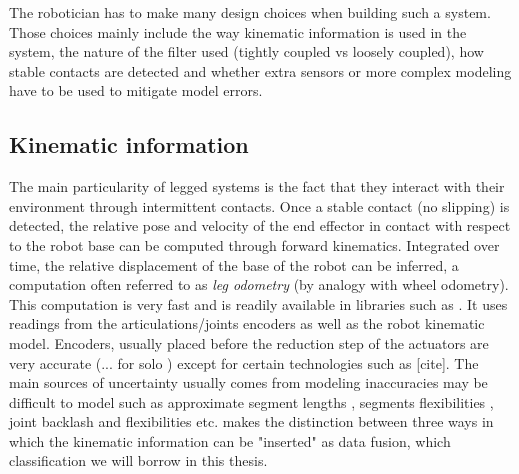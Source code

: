 The robotician has to make many design choices when building such a system. Those choices mainly include the way kinematic information is used in the system, 
the nature of the filter used (tightly coupled vs loosely coupled), how stable contacts are detected and whether extra sensors or more complex modeling have 
to be used to mitigate model errors.
 

\subsection{Kinematic information}
The main particularity of legged systems is the fact that they interact with their environment through intermittent contacts.
Once a stable contact (no slipping) is detected, the relative pose and velocity of the end effector in contact with respect to the robot base 
can be computed through forward kinematics. Integrated over time, the relative displacement of the base of the robot can be inferred, a computation 
often referred to as \textit{leg odometry} (by analogy with wheel odometry). This computation is very fast and is readily available in libraries such as \cite{carpentier2019pinocchio, hereid2017frost}. It uses
readings from the articulations/joints encoders as well as the robot kinematic model. Encoders, usually placed before the reduction step of the actuators
are very accurate (... for solo \cite{grimminger2020open}) except for certain technologies such as [cite]. The main sources of uncertainty usually comes from
modeling inaccuracies may be difficult to model such as approximate segment lengths , segments flexibilities \cite{vigne2018estimation}, 
joint backlash \cite{fallon2014drift} and flexibilities \cite{koolen2016design} etc. \cite{bloesch2018technical} makes the distinction between three ways in which the kinematic information can be "inserted" as data fusion, 
which classification we will borrow in this thesis. 


